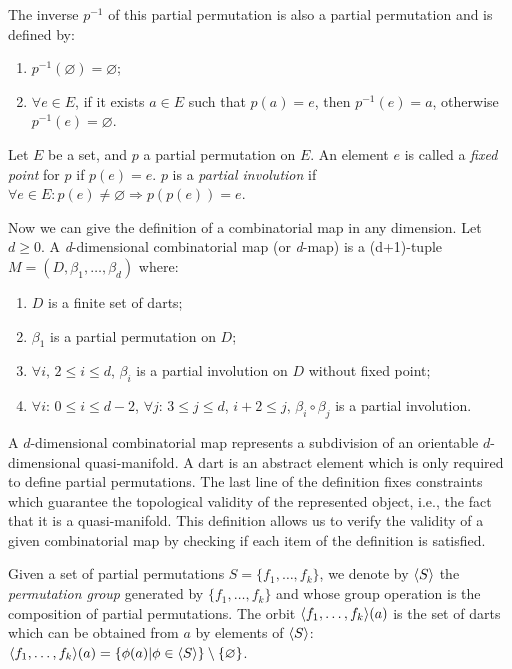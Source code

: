 The inverse $p^{-1}$ of this partial permutation is also a partial
permutation and is defined by:
\begin{enumerate}
\item $p^{-1}(\varnothing)=\varnothing$;
\item $\forall e \in E$, if it exists $a\in E$ such that $p(a)=e$,
  then $p^{-1}(e)=a$, otherwise $p^{-1}(e)=\varnothing$.
\end{enumerate}

Let $E$ be a set, and $p$ a partial permutation on $E$.  An element
$e$ is called a \emph{fixed point} for $p$ if $p(e)=e$.  $p$ is a
\emph{partial involution} if $\forall e \in E: p(e)\neq \varnothing
\Rightarrow p(p(e))=e$.

Now we can give the definition of a combinatorial map in any dimension.
Let $d \geq 0$. A \emph{d}-dimensional combinatorial map (or 
\emph{d}-map) is a (d+1)-tuple $M=(D,\beta_1,\ldots,\beta_d)$ 
where:
\begin{enumerate}
\item $D$ is a finite set of darts;
\item $\beta_1$ is a partial permutation on $D$;
\item $\forall i, \, 2 \leq i \leq d$, $\beta_i$ is a
  partial involution on $D$ without fixed point;
\item\label{cond-composition} $\forall i:\, 0 \leq i \leq d-2$,
  $\forall j:\, 3 \leq j \leq d$, $i+2 \leq j$,
  $\beta_{i}\circ\beta_{j}$ is a partial involution.
\end{enumerate}

A $d$-dimensional combinatorial map represents a subdivision of an
orientable $d$-dimensional quasi-manifold. A dart is an abstract element
which is only required to define partial permutations. The last line of
the definition fixes constraints which guarantee the topological
validity of the represented object, i.e., the fact that it is a
quasi-manifold. This definition allows us to verify the validity of a
given combinatorial map by checking if each item of the definition is
satisfied.

Given a set of partial permutations $S=\{f_1,\ldots,f_k\}$, we denote
by $\langle{}S\rangle{}$ the \emph{permutation group} generated by
$\{f_1,\ldots,f_k\}$ and whose group operation is the composition of
partial permutations.  The orbit $\langle{}f_1,\ldots,f_k\rangle{}(a)$ is the set
of darts which can be obtained from $a$ by elements of $\langle{}S\rangle{}$:
$\langle{}f_1,\ldots,f_k\rangle{}(a)=\{\phi(a)|\phi \in \langle{}S\rangle{}\}\setminus\{\varnothing\}$.

